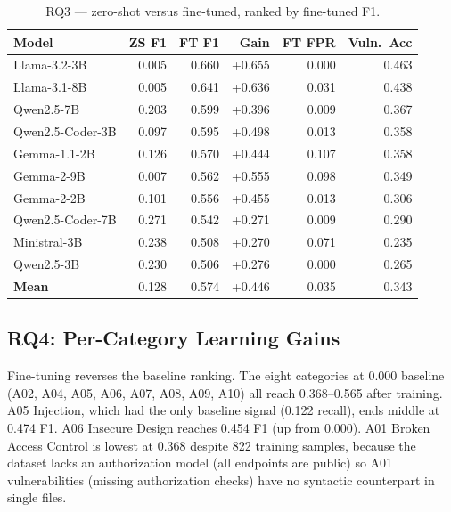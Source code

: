 \begin{table}[H]
\centering
\caption{RQ3 --- zero-shot versus fine-tuned, ranked by fine-tuned F1.}
\label{tab:rq3}
\footnotesize
\begin{tabular}{l r r r r r}
\toprule
\textbf{Model} & \textbf{ZS F1} & \textbf{FT F1} & \textbf{Gain} & \textbf{FT FPR} & \textbf{Vuln.\ Acc} \\
\midrule
Llama-3.2-3B & 0.005 & 0.660 & +0.655 & 0.000 & 0.463 \\
Llama-3.1-8B & 0.005 & 0.641 & +0.636 & 0.031 & 0.438 \\
Qwen2.5-7B & 0.203 & 0.599 & +0.396 & 0.009 & 0.367 \\
Qwen2.5-Coder-3B & 0.097 & 0.595 & +0.498 & 0.013 & 0.358 \\
Gemma-1.1-2B & 0.126 & 0.570 & +0.444 & 0.107 & 0.358 \\
Gemma-2-9B & 0.007 & 0.562 & +0.555 & 0.098 & 0.349 \\
Gemma-2-2B & 0.101 & 0.556 & +0.455 & 0.013 & 0.306 \\
Qwen2.5-Coder-7B & 0.271 & 0.542 & +0.271 & 0.009 & 0.290 \\
Ministral-3B & 0.238 & 0.508 & +0.270 & 0.071 & 0.235 \\
Qwen2.5-3B & 0.230 & 0.506 & +0.276 & 0.000 & 0.265 \\
\midrule
\textbf{Mean} & 0.128 & 0.574 & +0.446 & 0.035 & 0.343 \\
\bottomrule
\end{tabular}
\end{table}

\subsection{RQ4: Per-Category Learning Gains}

Fine-tuning reverses the baseline ranking. The eight categories at 0.000 baseline (A02, A04, A05, A06, A07, A08, A09, A10) all reach 0.368--0.565 after training. A05 Injection, which had the only baseline signal (0.122 recall), ends middle at 0.474 F1. A06 Insecure Design reaches 0.454 F1 (up from 0.000). A01 Broken Access Control is lowest at 0.368 despite 822 training samples, because the dataset lacks an authorization model (all endpoints are public) so A01 vulnerabilities (missing authorization checks) have no syntactic counterpart in single files.

